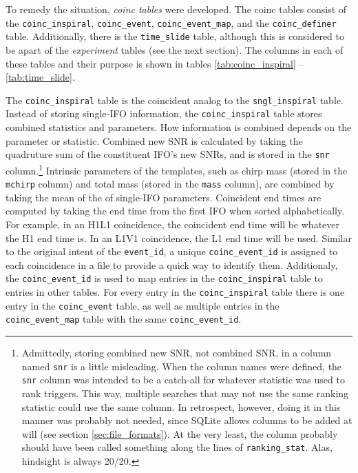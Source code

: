 To remedy the situation, \emph{coinc tables} were developed. The coinc tables consist of the \texttt{coinc\_inspiral}, \texttt{coinc\_event}, \texttt{coinc\_event\_map}, and the \texttt{coinc\_definer} table. Additionally, there is the \texttt{time\_slide} table, although this is considered to be apart of the \emph{experiment} tables (see the next section). The columns in each of these tables and their purpose is shown in tables \ref{tab:coinc_inspiral} -- \ref{tab:time_slide}.

The \texttt{coinc\_inspiral} table is the coincident analog to the \texttt{sngl\_inspiral} table. Instead of storing single-\ac{IFO} information, the \texttt{coinc\_inspiral} table stores combined statistics and parameters. How information is combined depends on the parameter or statistic. Combined new \ac{SNR} is calculated by taking the quadruture sum of the constituent \ac{IFO}'s new \acp{SNR}, and is stored in the \texttt{snr} column.\footnote{Admittedly, storing combined new \ac{SNR}, not combined \ac{SNR}, in a column named \texttt{snr} is a little misleading. When the column names were defined, the \texttt{snr} column was intended to be a catch-all for whatever statistic was used to rank triggers. This way, multiple searches that may not use the same ranking statistic could use the same column. In retrospect, however, doing it in this manner was probably not needed, since SQLite allows columns to be added at will (see section \ref{sec:file_formats}). At the very least, the column probably should have been called something along the lines of \texttt{ranking\_stat}. Alas, hindsight is always 20/20.} Intrinsic parameters of the templates, such as chirp mass (stored in the \texttt{mchirp} column) and total mass (stored in the \texttt{mass} column), are combined by taking the mean of the of single-\ac{IFO} parameters. Coincident end times are computed by taking the end time from the first \ac{IFO} when sorted alphabetically. For example, in an H1L1 coincidence, the coincident end time will be whatever the H1 end time is. In an L1V1 coincidence, the L1 end time will be used. Similar to the original intent of the \texttt{event\_id}, a unique \texttt{coinc\_event\_id} is assigned to each coincidence in a file to provide a quick way to identify them. Additionaly, the \texttt{coinc\_event\_id} is used to map entries in the \texttt{coinc\_inspiral} table to entries in other tables. For every entry in the \texttt{coinc\_inspiral} table there is one entry in the \texttt{coinc\_event} table, as well as multiple entries in the \texttt{coinc\_event\_map} table with the same \texttt{coinc\_event\_id}.

